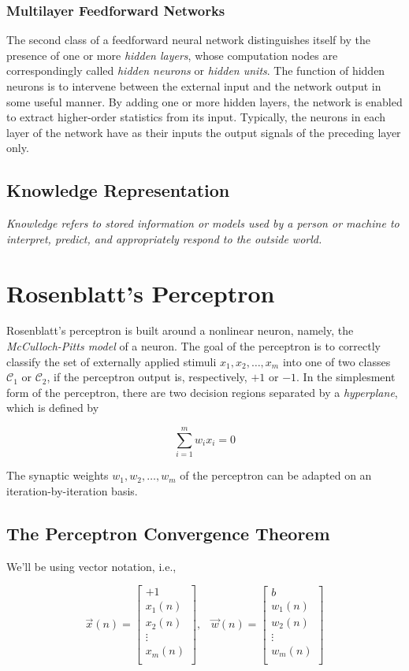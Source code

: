 \documentclass[twocolumn]{article}
\newcommand{\somatorio}{\displaystyle\sum}
\begin{document}
	 \subsubsection{Multilayer Feedforward Networks}
		 The second class of a feedforward neural network distinguishes itself by the presence of one or more \textit{hidden layers}, whose computation nodes are correspondingly called \textit{hidden neurons} or \textit{hidden units}. The function of hidden neurons is to intervene between the external input and the network output in some useful manner. By adding one or more hidden layers, the network is enabled to extract higher-order statistics from its input. Typically, the neurons in each layer of the network have as their inputs the output signals of the preceding layer only.

 \subsection{Knowledge Representation}
	 \textit{Knowledge refers to stored information or models used by a person or machine to interpret, predict, and appropriately respond to the outside world.}

\section{Rosenblatt's Perceptron}
 Rosenblatt's perceptron is built around a nonlinear neuron, namely, the \textit{McCulloch-Pitts model} of a neuron. The goal of the perceptron is to correctly classify the set of externally applied stimuli $ x_1, x_2, \ldots, x_m $ into one of two classes $ \mathcal{C}_{1} $ or $ \mathcal{C}_{2} $, if the perceptron output is, respectively, $ +1 $ or $ -1 $. In the simplesment form of the perceptron, there are two decision regions separated by a \textit{hyperplane}, which is defined by

 $$ \somatorio_{i = 1}^{m}w_{i}x_{i} = 0 $$

 The synaptic weights $ w_1, w_2, \ldots, w_m $ of the perceptron can be adapted on an iteration-by-iteration basis.

 \subsection{The Perceptron Convergence Theorem}
	 We'll be using vector notation, i.e.,

	 $$
		 \vec{x}(n) =
		 \begin{bmatrix}
			 +1        \\
			 x_{1} (n) \\
			 x_{2} (n) \\
			 \vdots    \\
			 x_{m} (n) \\
		 \end{bmatrix}
		 , \;\;\;
		 \vec{w} (n) =
		 \begin{bmatrix}
			 b         \\
			 w_{1} (n) \\
			 w_{2} (n) \\
			 \vdots    \\
			 w_{m} (n) \\
		 \end{bmatrix}
	 $$
\end{document}
